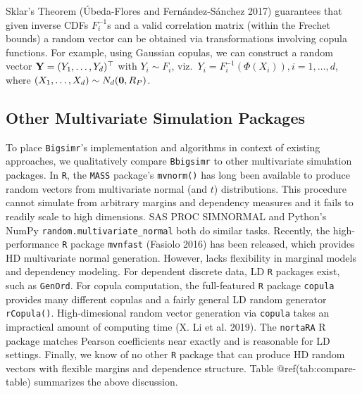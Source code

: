 \documentclass{article}
\begin{document}
Sklar's Theorem (Úbeda-Flores and Fernández-Sánchez 2017) guarantees
that given inverse CDFs \(F_i^{-1}\)s and a valid correlation matrix
(within the Frechet bounds) a random vector can be obtained via
transformations involving copula functions. For example, using Gaussian
copulas, we can construct a random vector
\({\bf Y} = (Y_1, \ldots, Y_d)^\top\) with \(Y_i \sim F_i\),
viz.~\(Y_i = F_i^{-1}(\Phi(X_i)), i=1, \ldots, d\), where
\((X_1, \ldots, X_d) \sim N_d({\bf 0}, R_P)\).

\hypertarget{other-multivariate-simulation-packages}{%
\subsection{Other Multivariate Simulation
Packages}\label{other-multivariate-simulation-packages}}

To place \texttt{Bigsimr}'s implementation and algorithms in context of
existing approaches, we qualitatively compare \texttt{Bbigsimr} to other
multivariate simulation packages. In \texttt{R}, the \texttt{MASS}
package's \texttt{mvnorm()} has long been available to produce random
vectors from multivariate normal (and \(t\)) distributions. This
procedure cannot simulate from arbitrary margins and dependency measures
and it fails to readily scale to high dimensions. SAS PROC SIMNORMAL and
Python's NumPy \texttt{random.multivariate\_normal} both do similar
tasks. Recently, the high-performance \texttt{R} package
\texttt{mvnfast} (Fasiolo 2016) has been released, which provides HD
multivariate normal generation. However, lacks flexibility in marginal
models and dependency modeling. For dependent discrete data, LD
\texttt{R} packages exist, such as \texttt{GenOrd}. For copula
computation, the full-featured \texttt{R} package \texttt{copula}
provides many different copulas and a fairly general LD random generator
\texttt{rCopula()}. High-dimesional random vector generation via
\texttt{copula} takes an impractical amount of computing time (X. Li et
al. 2019). The \texttt{nortaRA} R package matches Pearson coefficients
near exactly and is reasonable for LD settings. Finally, we know of no
other \texttt{R} package that can produce HD random vectors with
flexible margins and dependence structure. Table @ref(tab:compare-table)
summarizes the above discussion.
\end{document}
